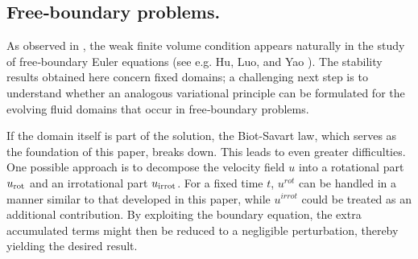 \documentclass[11pt,letterpaper]{amsart}
\theoremstyle{definition}
\theoremstyle{remark}
\newcommand{\p}{\partial}
\renewcommand{\tt}[1]{\text{#1}}
\numberwithin{equation}{section}
\begin{document}
\subsection{Free‑boundary problems.}

As observed in \cite{Dong2026StabilityOV}, the weak finite volume condition appears naturally in the study of free‑boundary Euler equations (see e.g. Hu, Luo, and Yao \cite{hu2024small}). The stability results obtained here concern fixed domains; a challenging next step is to understand whether an analogous variational principle can be formulated for the evolving fluid domains that occur in free‑boundary problems.

If the domain itself is part of the solution, the Biot-Savart law, which serves as the foundation of this paper, breaks down.  This leads to even greater difficulties. One possible approach is to decompose the velocity field $u$ into a rotational part $u_{\rm rot}$ and an irrotational part $u_{\rm irrot}$.
For a fixed time $t$, $u^{rot}$ can be handled in a manner similar to that developed in this paper, while $u^{irrot}$ could be treated as an additional contribution. By exploiting the boundary equation, the extra accumulated terms might then be reduced to a negligible perturbation, thereby yielding the desired result.

\end{document}
